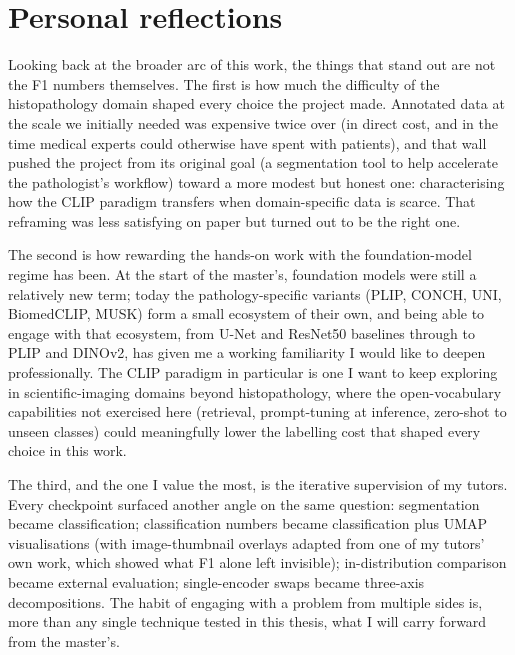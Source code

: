 \section{Personal reflections}
\label{sec:concl-personal}

Looking back at the broader arc of this work, the things that stand out are not the F1 numbers themselves. The first is how much the difficulty of the histopathology domain shaped every choice the project made. Annotated data at the scale we initially needed was expensive twice over (in direct cost, and in the time medical experts could otherwise have spent with patients), and that wall pushed the project from its original goal (a segmentation tool to help accelerate the pathologist's workflow) toward a more modest but honest one: characterising how the CLIP paradigm transfers when domain-specific data is scarce. That reframing was less satisfying on paper but turned out to be the right one.

The second is how rewarding the hands-on work with the foundation-model regime has been. At the start of the master's, foundation models were still a relatively new term; today the pathology-specific variants (PLIP, CONCH, UNI, BiomedCLIP, MUSK) form a small ecosystem of their own, and being able to engage with that ecosystem, from U-Net and ResNet50 baselines through to PLIP and DINOv2, has given me a working familiarity I would like to deepen professionally. The CLIP paradigm in particular is one I want to keep exploring in scientific-imaging domains beyond histopathology, where the open-vocabulary capabilities not exercised here (retrieval, prompt-tuning at inference, zero-shot to unseen classes) could meaningfully lower the labelling cost that shaped every choice in this work.

The third, and the one I value the most, is the iterative supervision of my tutors. Every checkpoint surfaced another angle on the same question: segmentation became classification; classification numbers became classification plus UMAP visualisations (with image-thumbnail overlays adapted from one of my tutors' own work, which showed what F1 alone left invisible); in-distribution comparison became external evaluation; single-encoder swaps became three-axis decompositions. The habit of engaging with a problem from multiple sides is, more than any single technique tested in this thesis, what I will carry forward from the master's.
